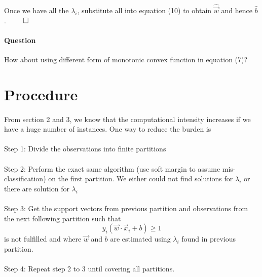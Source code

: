 \documentclass{article}
\begin{document}
\paragraph{}
Once we have all the $\lambda_i$, substitute all into equation (10) to obtain $\hat{\Vec{w}}$ and hence $\hat{b}$. $\qed$

\paragraph{Question} How about using different form of monotonic convex function in equation (7)?

\section{Procedure}
\paragraph{}
From section 2 and 3, we know that the computational intensity increases if we have a huge number of instances. One way to reduce the burden is
\paragraph{}
Step 1: Divide the observations into finite partitions
\paragraph{}
Step 2: Perform the exact same algorithm (use soft margin to assume mis-classification) on the first partition. We either could not find solutions for $\lambda_i$ or there are solution for $\lambda_i$
\paragraph{}
Step 3: Get the support vectors from previous partition and observations from the next following partition such that
\begin{equation*}
    y_i(\Vec{w}\cdot\Vec{x}_i +b) \geq 1
\end{equation*}
is not fulfilled and where $\Vec{w}$ and $b$ are estimated using $\lambda_i$ found in previous partition.
\paragraph{}
Step 4: Repeat step 2 to 3 until covering all partitions.
\end{document}

